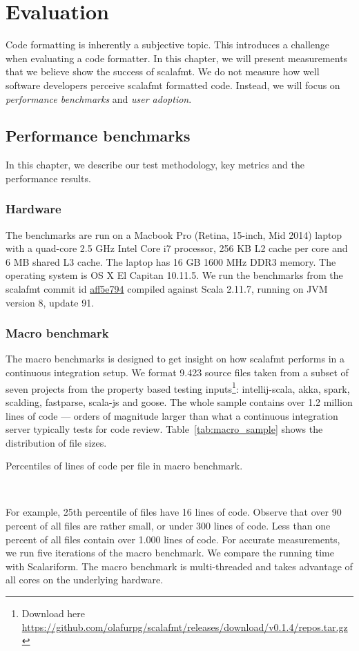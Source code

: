 \section{Evaluation}
Code formatting is inherently a subjective topic.
This introduces a challenge when evaluating a code formatter.
In this chapter, we will present measurements that we believe show the success of scalafmt.
We do not measure how well software developers perceive scalafmt formatted code.
Instead, we will focus on \emph{performance benchmarks} and \emph{user adoption}.

\subsection{Performance benchmarks}
In this chapter, we describe our test methodology, key metrics and the performance results.

\subsubsection{Hardware}
The benchmarks are run on a Macbook Pro (Retina, 15-inch, Mid 2014) laptop with a quad-core 2.5 GHz Intel Core i7 processor, 256 KB L2 cache per core and 6 MB shared L3 cache.
The laptop has 16 GB 1600 MHz DDR3 memory.
The operating system is OS X El Capitan 10.11.5.
We run the benchmarks from the scalafmt commit id \href{https://github.com/olafurpg/scalafmt/tree/aff5e794dae4787b08243f8abb87a3ca4d907e40}{aff5e794} compiled against Scala 2.11.7, running on JVM version 8, update 91.

\subsubsection{Macro benchmark}
The macro benchmarks is designed to get insight on how scalafmt performs in a continuous integration setup.
We format 9.423 source files taken from a subset of seven projects from the property based testing inputs\footnote{
  Download here \url{https://github.com/olafurpg/scalafmt/releases/download/v0.1.4/repos.tar.gz}
}: intellij-scala, akka, spark, scalding, fastparse, scala-js and goose.
The whole sample contains over 1.2 million lines of code --- orders of magnitude larger than what a continuous integration server typically tests for code review.
Table~\ref{tab:macro_sample} shows the distribution of file sizes.
\begin{table}
  \centering
  
  \caption{Percentiles of lines of code per file in macro benchmark.}~\label{tab:macro_sample}
\end{table}
For example, 25th percentile of files have 16 lines of code.
Observe that over 90 percent of all files are rather small, or under 300 lines of code.
Less than one percent of all files contain over 1.000 lines of code.
For accurate measurements, we run five iterations of the macro benchmark.
We compare the running time with Scalariform.
The macro benchmark is multi-threaded and takes advantage of all cores on the underlying hardware.

